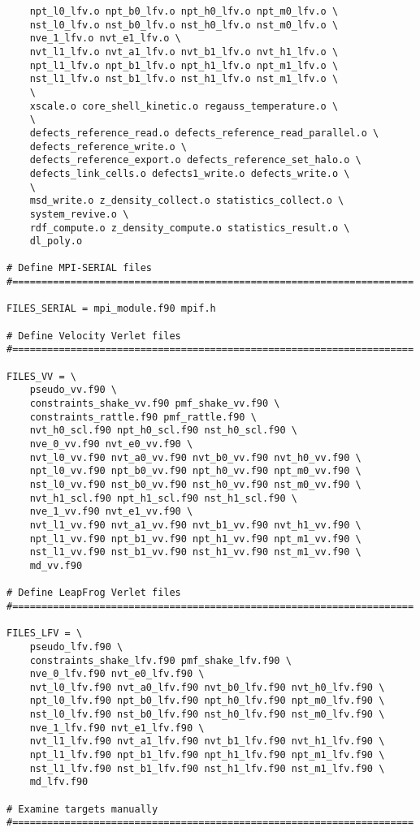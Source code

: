 \begin{verbatim}
	npt_l0_lfv.o npt_b0_lfv.o npt_h0_lfv.o npt_m0_lfv.o \
	nst_l0_lfv.o nst_b0_lfv.o nst_h0_lfv.o nst_m0_lfv.o \
	nve_1_lfv.o nvt_e1_lfv.o \
	nvt_l1_lfv.o nvt_a1_lfv.o nvt_b1_lfv.o nvt_h1_lfv.o \
	npt_l1_lfv.o npt_b1_lfv.o npt_h1_lfv.o npt_m1_lfv.o \
	nst_l1_lfv.o nst_b1_lfv.o nst_h1_lfv.o nst_m1_lfv.o \
	\
	xscale.o core_shell_kinetic.o regauss_temperature.o \
	\
	defects_reference_read.o defects_reference_read_parallel.o \
	defects_reference_write.o \
	defects_reference_export.o defects_reference_set_halo.o \
	defects_link_cells.o defects1_write.o defects_write.o \
	\
	msd_write.o z_density_collect.o statistics_collect.o \
	system_revive.o \
	rdf_compute.o z_density_compute.o statistics_result.o \
	dl_poly.o

# Define MPI-SERIAL files
#=====================================================================

FILES_SERIAL = mpi_module.f90 mpif.h

# Define Velocity Verlet files
#=====================================================================

FILES_VV = \
	pseudo_vv.f90 \
	constraints_shake_vv.f90 pmf_shake_vv.f90 \
	constraints_rattle.f90 pmf_rattle.f90 \
	nvt_h0_scl.f90 npt_h0_scl.f90 nst_h0_scl.f90 \
	nve_0_vv.f90 nvt_e0_vv.f90 \
	nvt_l0_vv.f90 nvt_a0_vv.f90 nvt_b0_vv.f90 nvt_h0_vv.f90 \
	npt_l0_vv.f90 npt_b0_vv.f90 npt_h0_vv.f90 npt_m0_vv.f90 \
	nst_l0_vv.f90 nst_b0_vv.f90 nst_h0_vv.f90 nst_m0_vv.f90 \
	nvt_h1_scl.f90 npt_h1_scl.f90 nst_h1_scl.f90 \
	nve_1_vv.f90 nvt_e1_vv.f90 \
	nvt_l1_vv.f90 nvt_a1_vv.f90 nvt_b1_vv.f90 nvt_h1_vv.f90 \
	npt_l1_vv.f90 npt_b1_vv.f90 npt_h1_vv.f90 npt_m1_vv.f90 \
	nst_l1_vv.f90 nst_b1_vv.f90 nst_h1_vv.f90 nst_m1_vv.f90 \
	md_vv.f90

# Define LeapFrog Verlet files
#=====================================================================

FILES_LFV = \
	pseudo_lfv.f90 \
	constraints_shake_lfv.f90 pmf_shake_lfv.f90 \
	nve_0_lfv.f90 nvt_e0_lfv.f90 \
	nvt_l0_lfv.f90 nvt_a0_lfv.f90 nvt_b0_lfv.f90 nvt_h0_lfv.f90 \
	npt_l0_lfv.f90 npt_b0_lfv.f90 npt_h0_lfv.f90 npt_m0_lfv.f90 \
	nst_l0_lfv.f90 nst_b0_lfv.f90 nst_h0_lfv.f90 nst_m0_lfv.f90 \
	nve_1_lfv.f90 nvt_e1_lfv.f90 \
	nvt_l1_lfv.f90 nvt_a1_lfv.f90 nvt_b1_lfv.f90 nvt_h1_lfv.f90 \
	npt_l1_lfv.f90 npt_b1_lfv.f90 npt_h1_lfv.f90 npt_m1_lfv.f90 \
	nst_l1_lfv.f90 nst_b1_lfv.f90 nst_h1_lfv.f90 nst_m1_lfv.f90 \
	md_lfv.f90

# Examine targets manually
#=====================================================================


\end{verbatim}
